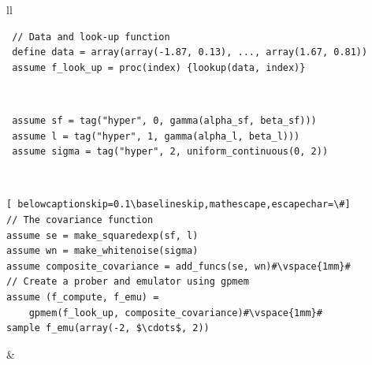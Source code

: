 \begin{tabular}{ll} \hline
{}
  \begin{minipage}{4cm}
 \footnotesize\begin{lstlisting}
 // Data and look-up function
 define data = array(array(-1.87, 0.13), ..., array(1.67, 0.81))
 assume f_look_up = proc(index) {lookup(data, index)}
\end{lstlisting}
\end{minipage}\\
\hline
{}
  \begin{minipage}{4cm}
 \footnotesize\begin{lstlisting}
 assume sf = tag("hyper", 0, gamma(alpha_sf, beta_sf)))
 assume l = tag("hyper", 1, gamma(alpha_l, beta_l)))
 assume sigma = tag("hyper", 2, uniform_continuous(0, 2))
\end{lstlisting}
\end{minipage}
  \\
\hline
\footnotesize\begin{lstlisting}[ belowcaptionskip=0.1\baselineskip,mathescape,escapechar=\#]
// The covariance function
assume se = make_squaredexp(sf, l)
assume wn = make_whitenoise(sigma)
assume composite_covariance = add_funcs(se, wn)#\vspace{1mm}#
// Create a prober and emulator using gpmem
assume (f_compute, f_emu) =
    gpmem(f_look_up, composite_covariance)#\vspace{1mm}#
sample f_emu(array(-2, $\cdots$, 2))
\end{lstlisting}
 &    \\ \hline


\end{tabular}
